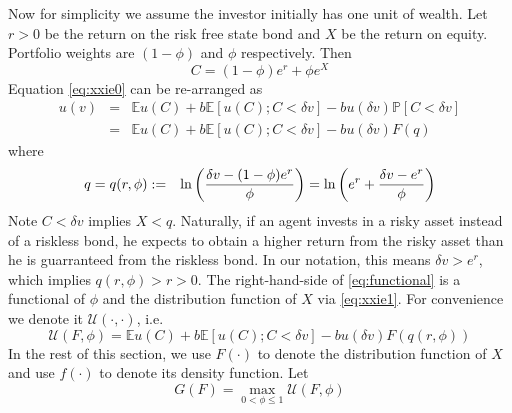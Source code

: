 \documentclass{article}
\newcommand{\E}{
  \mathbb{E}
}
\renewcommand{\P}{
  \mathbb{P}
}
\newcommand{\1}[1]{
  \mathbf{1}_{\{#1\}}
}
\begin{document}
Now for simplicity we assume the investor initially has one unit of
wealth. Let $r > 0$ be the return on the risk free state bond and $X$
be the return on equity. Portfolio weights are $\left(1-\phi\right)$
and $\phi$ respectively. Then
\begin{equation}
  \label{eq:xxie1}
  C = (1 - \phi) e^r + \phi e^X
\end{equation}
Equation \eqref{eq:xxie0} can be re-arranged as
\begin{eqnarray}
u(v) &=& \E u(C) + b \E [u(C); C < \delta v] - b u(\delta v) \P[C < \delta v] \nonumber \\
&=& \E u(C) + b \E [u(C); C < \delta v] - b u(\delta v) F(q) \label{eq:functional}
\end{eqnarray}
where
\begin{eqnarray*}
  q = q(r, \phi) &:=& \ln \left( {
      \delta v - (1 - \phi) e^r
      \over
      \phi
    } \right) = \ln\left(
    e^r + {\delta v - e^r \over \phi}
  \right)
\end{eqnarray*}
Note $C < \delta v$ implies $X < q$. Naturally, if an agent invests in
a risky asset instead of a riskless bond, he expects to obtain a
higher return from the risky asset than he is guarranteed from the
riskless bond. In our notation, this means $\delta v > e^r$, which
implies $q(r, \phi) > r > 0$. The right-hand-side of
\eqref{eq:functional} is a functional of $\phi$ and the distribution
function of $X$ via \eqref{eq:xxie1}. For convenience we denote it
$\mathcal U(\cdot, \cdot)$, i.e.
\begin{equation}
  \label{eq:U_functional}
  \mathcal U(F, \phi)
  = 
  \E u(C) + b \E [u(C); C < \delta v] - b u(\delta v) F(q(r, \phi))
\end{equation}
In the rest of this section, we use $F(\cdot)$ to denote the
distribution function of $X$ and use $f(\cdot)$ to denote its density
function. Let
\begin{equation}
  \label{eq:G_functional}
  G(F) = \max_{0 < \phi \leq 1} \mathcal U(F, \phi)  
\end{equation}
\end{document}

